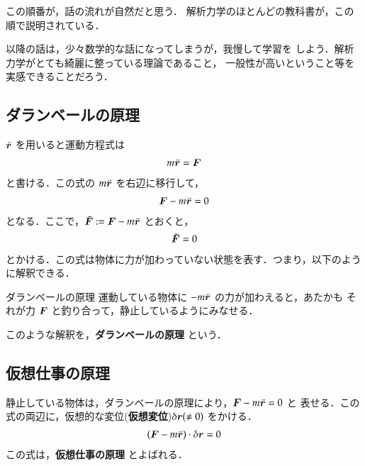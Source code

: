             この順番が，話の流れが自然だと思う．
            解析力学のほとんどの教科書が，この順で説明されている．

            以降の話は，少々数学的な話になってしまうが，我慢して学習を
            しよう．解析力学がとても綺麗に整っている理論であること，
            一般性が高いということ等を実感できることだろう．

        \subsection{ダランベールの原理}
            $\ddot{\boldsymbol{r}}$ を用いると運動方程式は
                \begin{align}
                    m\ddot{\boldsymbol{r}} = \boldsymbol{F}
                \end{align}
            と書ける．この式の $m\ddot{\boldsymbol{r}}$ を右辺に移行して，
                \begin{align}
                    \boldsymbol{F}-m\ddot{\boldsymbol{r}} = 0
                \end{align}
            となる．ここで，$\bar{\boldsymbol{F}} := \boldsymbol{F}-m\ddot{\boldsymbol{r}}$ とおくと，
                \begin{align}
                    \bar{\boldsymbol{F}} = 0
                \end{align}
            とかける．この式は物体に力が加わっていない状態を表す．つまり，以下のように解釈できる．
                \begin{myshadebox}{ダランベールの原理}
                    運動している物体に $-m\ddot{\boldsymbol{r}}$ の力が加わえると，あたかも
                    それが力 $\boldsymbol{F}$ と釣り合って，静止しているようにみなせる．
                \end{myshadebox}

            このような解釈を，\textbf{ダランベールの原理} という．

        \subsection{仮想仕事の原理}
            静止している物体は，ダランベールの原理により，$\boldsymbol{F}-m\ddot{\boldsymbol{r}} = 0$ と
            表せる．この式の両辺に，仮想的な変位(\textbf{仮想変位})$\delta\boldsymbol{r} (\neq0)$ をかける．
                \begin{align}\label{k_sigo}
                    \left(\bF-m\ddot{\br}\right)\cdot\delta\br  = 0
                \end{align}
            この式は，\textbf{仮想仕事の原理} とよばれる．

